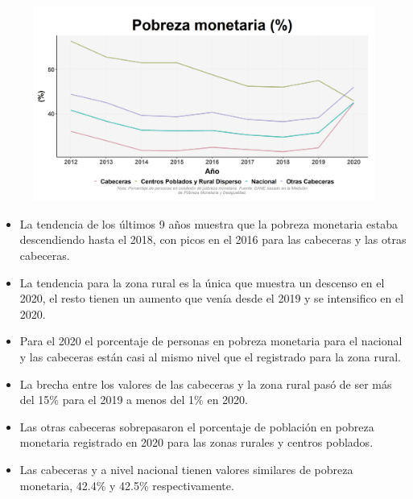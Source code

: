     \begin{figure}[H]
        \caption[Pobreza monetaria por zonas y nacional ]{\label{pobreza_monetaria_zonas} }
        \begin{center}
        \includegraphics[width=\textwidth,keepaspectratio]{img/var_264_trend.png}
        \end{center}
    \end{figure}
            \begin{itemize}
                    \item La tendencia de los últimos 9 años muestra que la pobreza monetaria estaba descendiendo hasta el 2018, con picos en el 2016 para las cabeceras y las otras cabeceras.
                    \item La tendencia para la zona rural es la única que muestra un descenso en el 2020, el resto tienen un aumento que venía desde el 2019 y se intensifico en el 2020.
                    \item Para el 2020 el porcentaje de personas en pobreza monetaria para el nacional y las cabeceras están casi al mismo nivel que el registrado para la zona rural.
                    \item La brecha entre los valores de las cabeceras y la zona rural pasó de ser más del 15\% para el 2019 a menos del 1\% en 2020.
                    \item Las otras cabeceras sobrepasaron el porcentaje de población en pobreza monetaria registrado en 2020 para las zonas rurales y centros poblados.
                    \item Las cabeceras y a nivel nacional tienen valores similares de pobreza monetaria, 42.4\% y 42.5\% respectivamente.
                    \end{itemize}

